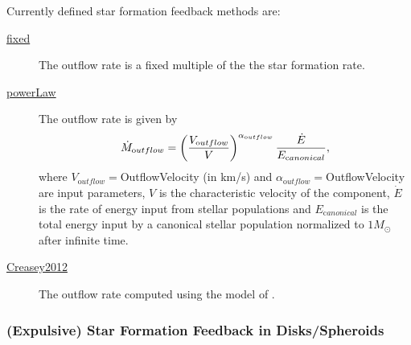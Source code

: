 Currently defined star formation feedback methods are:
\begin{description}
 \item [\hyperlink{star_formation.feedback.disks.fixed.F90:star_formation_feedback_disks_fixed}{{\normalfont \ttfamily fixed}}] The outflow rate is a fixed multiple of the the star formation rate.
 \item [\hyperlink{star_formation.feedback.spheroids.power_law.F90:star_formation_feedback_spheroids_power_law:star_formation_feedback_spheroid_outflow_rate_power_law}{{\normalfont \ttfamily powerLaw}}] The outflow rate is given by
\begin{equation}
 \dot{M}_{\mathrm outflow} = \left({V_{\mathrm outflow} \over V}\right)^{\alpha_{\mathrm outflow}} {\dot{E} \over E_{\mathrm canonical}},
\end{equation}
where $V_{\mathrm outflow}=${\normalfont {}OutflowVelocity} (in km/s) and $\alpha_{\mathrm outflow}=${\normalfont {}OutflowVelocity} are input parameters, $V$ is the characteristic velocity of the component, $\dot{E}$ is the rate of energy input from stellar populations and $E_{\mathrm canonical}$ is the total energy input by a canonical stellar population normalized to $1 M_\odot$ after infinite time.
 \item [\hyperlink{star_formation.feedback.disks.Creasey2012.F90:star_formation_feedback_disks_creasey2012}{{\normalfont \ttfamily Creasey2012}}] The outflow rate computed using the model of \cite{creasey_how_2012}.
\end{description}

\subsubsection{(Expulsive) Star Formation Feedback in Disks/Spheroids}

